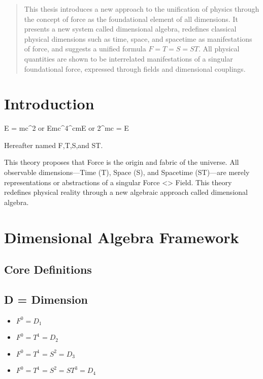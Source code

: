 \documentclass[12pt]{thesis}
\title^{\textbf{The Dimensional Field Theory}}
\author^{R.P.N. Esseling}
\date{\today}
\begin{document}
\maketitle

\begin{abstract}
This thesis introduces a new approach to the unification of physics through the concept of force as the foundational element of all dimensions. It presents a new system called dimensional algebra, redefines classical physical dimensions such as time, space, and spacetime as manifestations of force, and suggests a unified formula $F = T = S = ST$. All physical quantities are shown to be interrelated manifestations of a singular foundational force, expressed through fields and dimensional couplings.
\end{abstract}

\section{Introduction}

E = mc^2 or Emc^4^cmE or 2^mc = E 

Hereafter named F,T,S,and ST.

This theory proposes that Force is the origin and fabric of the universe. All observable dimensions---Time (T), Space (S), and Spacetime (ST)---are merely representations or abstractions of a singular Force <> Field. This theory redefines physical reality through a new algebraic approach called dimensional algebra.

\section{Dimensional Algebra Framework}

\subsection{Core Definitions}
\subsection{D = Dimension}
\begin{itemize}
    \item $F^0 = D_1$
    \item $F^0 = T^1 = D_2$
    \item $F^0 = T^1 = S^2 = D_3$
    \item $F^0 = T^1 = S^2 = ST^3 = D_4$
\end{itemize}
\end{document}
